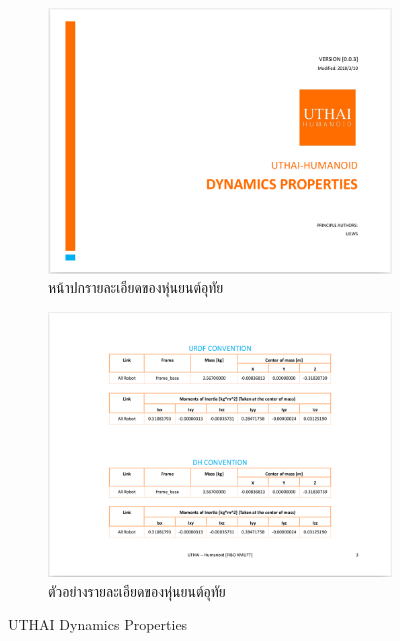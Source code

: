 \begin{figure}[!ht]
    \centering
    \begin{subfigure}[b]{0.45\textwidth}
        \centering
        \includegraphics[width=\textwidth]{chapter4/images/uthai_manual/uthai_dynamics.png}
        \caption{หน้าปกรายละเอียดของหุ่นยนต์อุทัย}
    \end{subfigure}
    \hfill
    \begin{subfigure}[b]{0.45\textwidth}
        \centering
        \includegraphics[width=\textwidth]{chapter4/images/uthai_manual/uthai_dynamics2.png}
        \caption{ตัวอย่างรายละเอียดของหุ่นยนต์อุทัย}
    \end{subfigure}
    \caption{UTHAI Dynamics Properties}
	\label{fig:uthai_dynamics_manual}
\end{figure}


